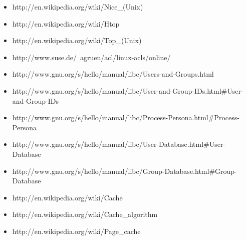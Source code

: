 \documentclass[a4paper,10pt]{article}
\begin{document}
\begin{itemize}
  \item http://en.wikipedia.org/wiki/Nice\_(Unix)
  \item http://en.wikipedia.org/wiki/Htop
  \item http://en.wikipedia.org/wiki/Top\_(Unix)
  \item http://www.suse.de/~agruen/acl/linux-acls/online/
  \item http://www.gnu.org/s/hello/manual/libc/Users-and-Groups.html
  \item http://www.gnu.org/s/hello/manual/libc/User-and-Group-IDs.html\#User-and-Group-IDs
  \item http://www.gnu.org/s/hello/manual/libc/Process-Persona.html\#Process-Persona
  \item http://www.gnu.org/s/hello/manual/libc/User-Database.html\#User-Database
  \item http://www.gnu.org/s/hello/manual/libc/Group-Database.html\#Group-Database
  \item http://en.wikipedia.org/wiki/Cache
  \item http://en.wikipedia.org/wiki/Cache\_algorithm
  \item http://en.wikipedia.org/wiki/Page\_cache 
\end{itemize}
   
\end{document}

